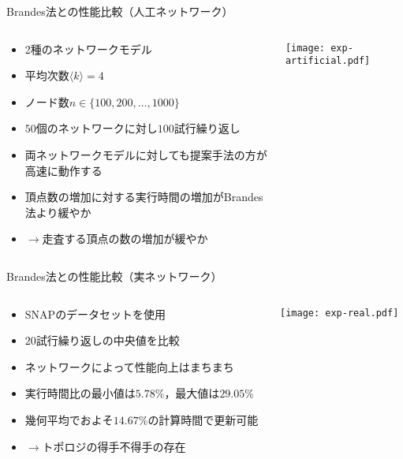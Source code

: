 \documentclass[dvipdfmx,fleqn]{beamer}
\begin{document}
\begin{frame}[allowframebreaks]{Brandes法との性能比較（人工ネットワーク）}
  \begin{columns}
    \begin{column}{.5\textwidth}
      \begin{itemize}
      \item 2種のネットワークモデル
      \item 平均次数$\langle k\rangle=4$
      \item ノード数$n\in\{100,200,\ldots,1000\}$
      \item $50$個のネットワークに対し$100$試行繰り返し
      \end{itemize}
      \begin{itemize}
      \item 両ネットワークモデルに対しても提案手法の方が高速に動作する
      \item 頂点数の増加に対する実行時間の増加がBrandes法より緩やか
      \item[] $\rightarrow$\alert{走査する頂点の数の増加が緩やか}
      \end{itemize}
    \end{column}
    \begin{column}{.5\textwidth}
      \texttt{[image: exp-artificial.pdf]}
    \end{column}
  \end{columns}
\end{frame}

\begin{frame}[allowframebreaks]{Brandes法との性能比較（実ネットワーク）}
  \begin{columns}
    \begin{column}{.5\textwidth}
      \begin{itemize}
      \item SNAP\cite{32Leskovec2016}のデータセットを使用
      \item $20$試行繰り返しの中央値を比較
      \end{itemize}
      \begin{itemize}
      \item ネットワークによって性能向上はまちまち
      \item 実行時間比の最小値は$5.78\%$，最大値は$29.05\%$
      \item 幾何平均でおよそ$14.67\%$の計算時間で更新可能
      \item[] $\rightarrow$\alert{トポロジの得手不得手の存在}
      \end{itemize}
    \end{column}
    \begin{column}{.5\textwidth}
      \texttt{[image: exp-real.pdf]}
    \end{column}
  \end{columns}
\end{frame}
\end{document}
